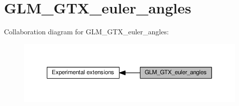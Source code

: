 \hypertarget{group__gtx__euler__angles}{}\section{G\+L\+M\+\_\+\+G\+T\+X\+\_\+euler\+\_\+angles}
\label{group__gtx__euler__angles}
Collaboration diagram for G\+L\+M\+\_\+\+G\+T\+X\+\_\+euler\+\_\+angles\+:
\nopagebreak
\begin{figure}[H]
\begin{center}
\leavevmode
\includegraphics[width=350pt]{d2/d7e/group__gtx__euler__angles}
\end{center}
\end{figure}

